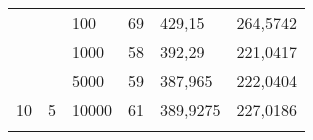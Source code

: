 \documentclass{article}
\begin{document}
\begin{table}[h]
\begin{tabular}{llllll}
			&                                                                       &                                                                           &                                                                              &                                                                                     &                                                                                       \\ \hline
			\multicolumn{1}{|l|}{}                                                 & \multicolumn{1}{l|}{}                                                 & \multicolumn{1}{l|}{100}                                                  & \multicolumn{1}{l|}{69}                                                      & \multicolumn{1}{l|}{429,15}                                                         & \multicolumn{1}{l|}{264,5742}                                                         \\ \cline{3-6} 
			\multicolumn{1}{|l|}{}                                                 & \multicolumn{1}{l|}{}                                                 & \multicolumn{1}{l|}{1000}                                                 & \multicolumn{1}{l|}{58}                                                      & \multicolumn{1}{l|}{392,29}                                                         & \multicolumn{1}{l|}{221,0417}                                                         \\ \cline{3-6} 
			\multicolumn{1}{|l|}{}                                                 & \multicolumn{1}{l|}{}                                                 & \multicolumn{1}{l|}{5000}                                                 & \multicolumn{1}{l|}{59}                                                      & \multicolumn{1}{l|}{387,965}                                                        & \multicolumn{1}{l|}{222,0404}                                                         \\ \cline{3-6} 
			\multicolumn{1}{|l|}{\multirow{-4}{*}{10}}                             & \multicolumn{1}{l|}{\multirow{-4}{*}{5}}                              & \multicolumn{1}{l|}{10000}                                                & \multicolumn{1}{l|}{61}                                                      & \multicolumn{1}{l|}{389,9275}                                                       & \multicolumn{1}{l|}{227,0186}                                                         \\ \hline
			&                                                                       &                                                                           &                                                                              &                                                                                     &                                                                                       \\ \hline

\end{tabular}
\end{table}
\end{document}
